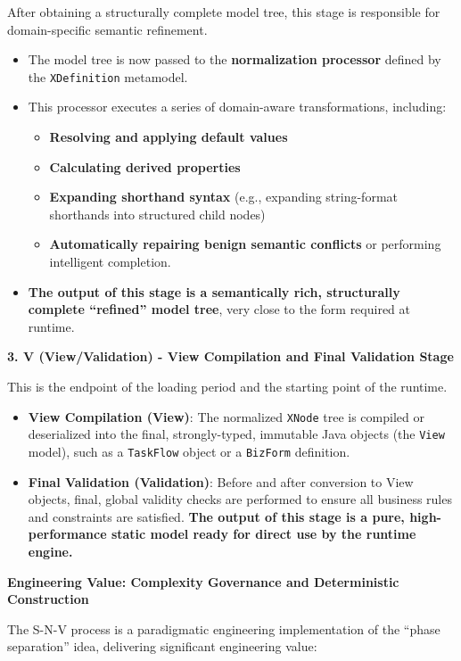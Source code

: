 \documentclass[11pt]{article}
\begin{document}
After obtaining a structurally complete model tree, this stage is responsible for domain-specific semantic refinement.
\begin{itemize}
\item The model tree is now passed to the \textbf{normalization processor} defined by the \texttt{XDefinition} metamodel.
\item This processor executes a series of domain-aware transformations, including:
\begin{itemize}
\item \textbf{Resolving and applying default values}
\item \textbf{Calculating derived properties}
\item \textbf{Expanding shorthand syntax} (e.g., expanding string-format shorthands into structured child nodes)
\item \textbf{Automatically repairing benign semantic conflicts} or performing intelligent completion.
\end{itemize}
\item \textbf{The output of this stage is a semantically rich, structurally complete ``refined'' model tree}, very close to the form required at runtime.
\end{itemize}

\textbf{3. V (View/Validation) - View Compilation and Final Validation Stage}

This is the endpoint of the loading period and the starting point of the runtime.
\begin{itemize}
\item \textbf{View Compilation (View)}: The normalized \texttt{XNode} tree is compiled or deserialized into the final, strongly-typed, immutable Java objects (the \texttt{View} model), such as a \texttt{TaskFlow} object or a \texttt{BizForm} definition.
\item \textbf{Final Validation (Validation)}: Before and after conversion to View objects, final, global validity checks are performed to ensure all business rules and constraints are satisfied. \textbf{The output of this stage is a pure, high-performance static model ready for direct use by the runtime engine.}
\end{itemize}

\textbf{Engineering Value: Complexity Governance and Deterministic Construction}

The S-N-V process is a paradigmatic engineering implementation of the ``phase separation'' idea, delivering significant engineering value:
\end{document}

